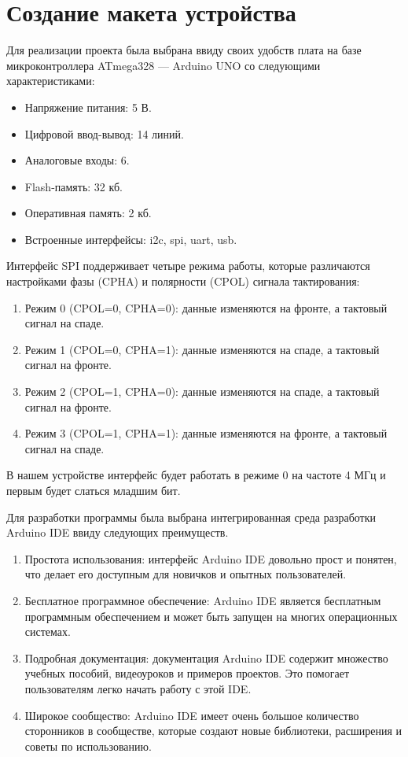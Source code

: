 \documentclass[14pt, oneside]{altsu-report}
\begin{document}
\chapter{Создание макета устройства} 
	Для реализации проекта была выбрана ввиду своих удобств плата на базе микроконтроллера ATmega328 --- Arduino UNO со следующими характеристиками: 
	\begin{itemize}
		\item Напряжение питания: 5 В.
		\item Цифровой ввод-вывод: 14 линий.
		\item Аналоговые входы: 6.
		\item Flash-память: 32 кб.
		\item Оперативная память: 2 кб.
		\item Встроенные интерфейсы: i2c, spi, uart, usb.
	\end{itemize}
	
		Интерфейс SPI поддерживает четыре режима работы, которые различаются настройками фазы (CPHA) и полярности (CPOL) сигнала тактирования:
	\begin{enumerate}
		\item Режим 0 (CPOL=0, CPHA=0): данные изменяются на фронте, а тактовый сигнал на спаде.
		\item Режим 1 (CPOL=0, CPHA=1): данные изменяются на спаде, а тактовый сигнал на фронте.
		\item Режим 2 (CPOL=1, CPHA=0): данные изменяются на спаде, а тактовый сигнал на фронте.
		\item Режим 3 (CPOL=1, CPHA=1): данные изменяются на фронте, а тактовый сигнал на спаде.
	\end{enumerate}
	
		В нашем устройстве интерфейс будет работать в режиме 0 на частоте 4 МГц и первым будет слаться младшим бит. 
	
	Для разработки программы была выбрана интегрированная среда разработки Arduino IDE ввиду следующих преимуществ.
	\begin{enumerate}
		\item Простота использования: интерфейс Arduino IDE довольно прост и понятен, что делает его доступным для новичков и опытных пользователей.
		\item Бесплатное программное обеспечение: Arduino IDE является бесплатным программным обеспечением и может быть запущен на многих операционных системах.
		\item Подробная документация: документация Arduino IDE содержит множество учебных пособий, видеоуроков и примеров проектов. Это помогает пользователям легко начать работу с этой IDE.
		\item Широкое сообщество: Arduino IDE имеет очень большое количество сторонников в сообществе, которые создают новые библиотеки, расширения и советы по использованию.
	\end{enumerate}
	
\end{document}
